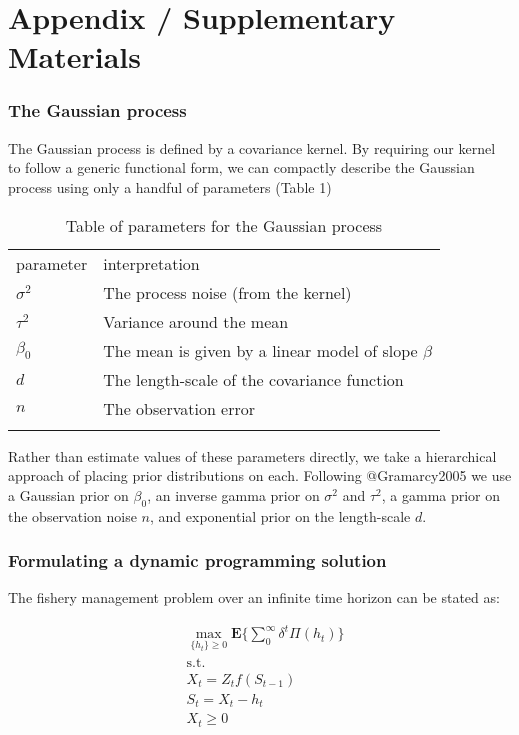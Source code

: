 \documentclass[author-year, review]{elsarticle} %
\begin{document}
\section{Appendix / Supplementary Materials}

\subsubsection{The Gaussian process}

The Gaussian process is defined by a covariance kernel. By requiring our
kernel to follow a generic functional form, we can compactly describe
the Gaussian process using only a handful of parameters (Table 1)

\begin{longtable}[c]{@{}ll@{}}
\hline\noalign{\medskip}
parameter & interpretation
\\\noalign{\medskip}
\hline\noalign{\medskip}
$\sigma^2$ & The process noise (from the kernel)
\\\noalign{\medskip}
$\tau^2$ & Variance around the mean
\\\noalign{\medskip}
$\beta_0$ & The mean is given by a linear model of slope $\beta$
\\\noalign{\medskip}
$d$ & The length-scale of the covariance function
\\\noalign{\medskip}
$n$ & The observation error
\\\noalign{\medskip}
\hline
\noalign{\medskip}
\caption{Table of parameters for the Gaussian process}
\end{longtable}

Rather than estimate values of these parameters directly, we take a
hierarchical approach of placing prior distributions on each. Following
@Gramarcy2005 we use a Gaussian prior on $\beta_0$, an inverse gamma
prior on $\sigma^2$ and $\tau^2$, a gamma prior on the observation noise
$n$, and exponential prior on the length-scale $d$.

\subsubsection{Formulating a dynamic programming solution}

The fishery management problem over an infinite time horizon can be
stated as:

\begin{align}
& \max_{ \{h_t\} \geq 0 } \mathbf{E} \lbrace \sum_0^\infty \delta^t \Pi(h_t) \rbrace \\
& \mathrm{s.t.}  \\
 & X_t = Z_t f\left(S_{t-1}\right) \\
 & S_t = X_t - h_t \\
 & X_t  \geq 0 
\end{align}
\end{document}
